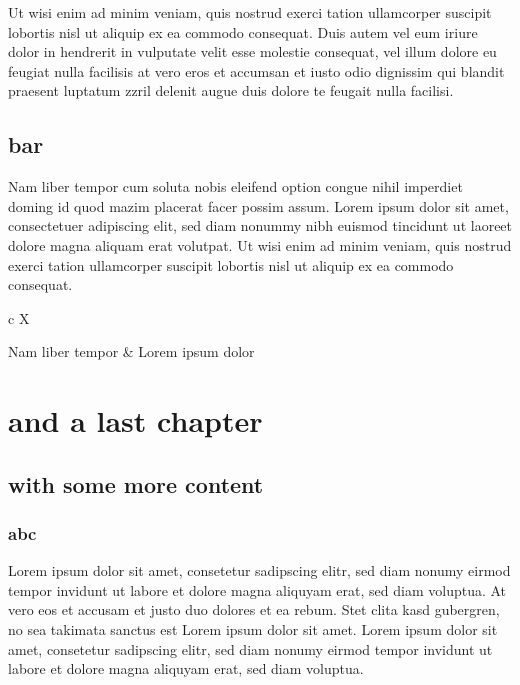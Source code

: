 \documentclass[10pt,twoside,twocolumn,openany,nodeprecatedcode]{dndbook}
\begin{document}
Ut wisi enim ad minim veniam, quis nostrud exerci tation ullamcorper suscipit lobortis nisl ut aliquip ex ea commodo consequat. Duis autem vel eum iriure dolor in hendrerit in vulputate velit esse molestie consequat, vel illum dolore eu feugiat nulla facilisis at vero eros et accumsan et iusto odio dignissim qui blandit praesent luptatum zzril delenit augue duis dolore te feugait nulla facilisi. 

\section{bar}

Nam liber tempor cum soluta nobis eleifend option congue nihil imperdiet doming id quod mazim placerat facer possim assum. Lorem ipsum dolor sit amet, consectetuer adipiscing elit, sed diam nonummy nibh euismod tincidunt ut laoreet dolore magna aliquam erat volutpat. Ut wisi enim ad minim veniam, quis nostrud exerci tation ullamcorper suscipit lobortis nisl ut aliquip ex ea commodo consequat. 

\begin{DndTable}{c X}

Nam liber tempor & Lorem ipsum dolor\\
\end{DndTable}


\chapter{and a last chapter}

\section{with some more content}

\subsection{abc}

Lorem ipsum dolor sit amet, consetetur sadipscing elitr, sed diam nonumy eirmod tempor invidunt ut labore et dolore magna aliquyam erat, sed diam voluptua. At vero eos et accusam et justo duo dolores et ea rebum. Stet clita kasd gubergren, no sea takimata sanctus est Lorem ipsum dolor sit amet. Lorem ipsum dolor sit amet, consetetur sadipscing elitr, sed diam nonumy eirmod tempor invidunt ut labore et dolore magna aliquyam erat, sed diam voluptua.
\end{document}

